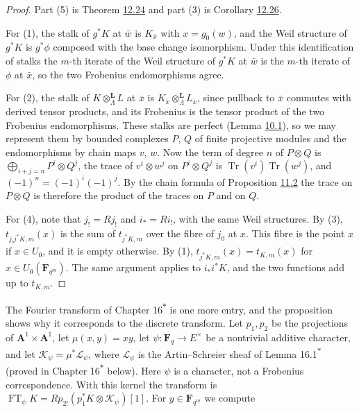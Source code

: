 \documentclass[11pt]{article}
\newcommand{\bpout}[1]{#1\textsuperscript{\hyperlink{bp-outside}{\ensuremath{\ast}}}}
\begin{document}
\begin{proof}[{Proof}]\label{bp310}%
Part (5) is Theorem \hyperref[bp298]{12.24} and part (3) is Corollary \hyperref[bp305]{12.26}.

For (1), the stalk of \(g^*K\) at \(\bar w\) is \(K_{\bar x}\) with \(x=g_0(w)\), and the Weil structure of \(g^*K\) is \(g^*\phi\) composed with the base change isomorphism. Under this identification of stalks the \(m\)-th iterate of the Weil structure of \(g^*K\) at \(\bar w\) is the \(m\)-th iterate of \(\phi\) at \(\bar x\), so the two Frobenius endomorphisms agree.

For (2), the stalk of \(K\otimes^{\mathbf L}_\Lambda L\) at \(\bar x\) is \(K_{\bar x}\otimes^{\mathbf L}_\Lambda L_{\bar x}\), since pullback to \(\bar x\) commutes with derived tensor products, and its Frobenius is the tensor product of the two Frobenius endomorphisms. These stalks are perfect (Lemma \hyperref[bp105]{10.1}), so we may represent them by bounded complexes \(P\), \(Q\) of finite projective modules and the endomorphisms by chain maps \(v\), \(w\). Now the term of degree \(n\) of \(P\otimes Q\) is \(\bigoplus_{i+j=n}P^i\otimes Q^j\), the trace of \(v^i\otimes w^j\) on \(P^i\otimes Q^j\) is \(\operatorname{Tr}(v^i)\operatorname{Tr}(w^j)\), and \((-1)^n=(-1)^i(-1)^j\). By the chain formula of Proposition \hyperref[bp176]{11.2} the trace on \(P\otimes Q\) is therefore the product of the traces on \(P\) and on \(Q\).

For (4), note that \(j_!=Rj_!\) and \(i_*=Ri_!\), with the same Weil structures. By (3), \(t_{j_!j^*K,m}(x)\) is the sum of \(t_{j^*K,m}\) over the fibre of \(j_0\) at \(x\). This fibre is the point \(x\) if \(x\in U_0\), and it is empty otherwise. By (1), \(t_{j^*K,m}(x)=t_{K,m}(x)\) for \(x\in U_0(\mathbf F_{q^m})\). The same argument applies to \(i_*i^*K\), and the two functions add up to \(t_{K,m}\).
\end{proof}

\label{bp311}%
The Fourier transform of Chapter \bpout{16} is one more entry, and the proposition shows why it corresponds to the discrete transform. Let \(p_1,p_2\) be the projections of \(\mathbf A^1\times\mathbf A^1\), let \(\mu(x,y)=xy\), let \(\psi:\mathbf F_q\to E^\times\) be a nontrivial additive character, and let \(\mathcal K_\psi=\mu^*\mathcal L_\psi\), where \(\mathcal L_\psi\) is the Artin–Schreier sheaf of Lemma \bpout{16.1} (proved in Chapter \bpout{16} below). Here \(\psi\) is a character, not a Frobenius correspondence. With this kernel the transform is \(\operatorname{FT}_\psi K=Rp_{2!}(p_1^*K\otimes\mathcal K_\psi)[1]\). For \(y\in\mathbf F_{q^m}\) we compute
\end{document}
